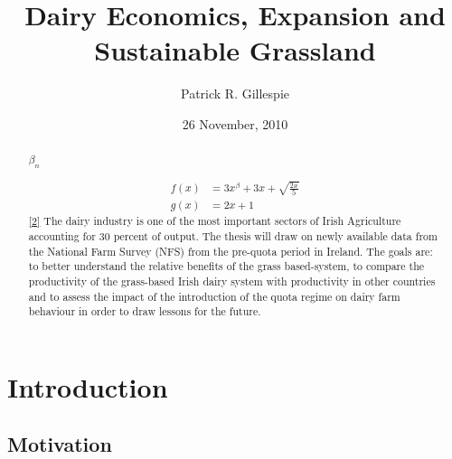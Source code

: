 \documentclass[12pt]{report}
\title{Dairy Economics, Expansion and Sustainable Grassland}
\author{Patrick R. Gillespie}
\date{26 November, 2010}
\def\dsp{\def\baselinestretch{2.0}\large\normalsize}
\begin{document}
\maketitle
\begin{abstract}


$\beta_n$

\begin{align*}
f(x)&= 3x^\beta + 3x +\sqrt{\frac{2x}{5}}\\
\label{1}
g(x)&= 2x+1
\label{2}
\end{align*}
\ref{2}
The dairy industry is one of the most important sectors of Irish Agriculture accounting for 30 percent of output. The thesis will draw on newly available data from the National Farm Survey (NFS) from the pre-quota period in Ireland. The goals are: to better understand the relative benefits of the grass based-system, to compare the productivity of the grass-based Irish dairy system with productivity in other countries and to assess the impact of the introduction of the quota regime on dairy farm behaviour in order to draw lessons for the future.
\end{abstract}


\chapter{Introduction}

\section{Motivation}

\end{document}
